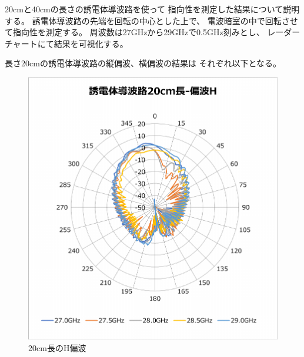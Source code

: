 \documentclass[technicalreport]{ieicej}
\begin{document}
20cmと40cmの長さの誘電体導波路を使って
指向性を測定した結果について説明する。
誘電体導波路の先端を回転の中心とした上で、
電波暗室の中で回転させて指向性を測定する。
周波数は27GHzから29GHzで0.5GHz刻みとし、
レーダーチャートにて結果を可視化する。

長さ20cmの誘電体導波路の縦偏波、横偏波の結果は
それぞれ以下となる。

\begin{figure}[tb]
  \begin{center}
    \includegraphics[bb=0 0 408 430, width=0.9\linewidth]{img/waveguide-20cm-h.pdf}
    \caption{20cm長のH偏波}
    \label{fig:20cm-h}
  \end{center}
\end{figure}
\end{document}
